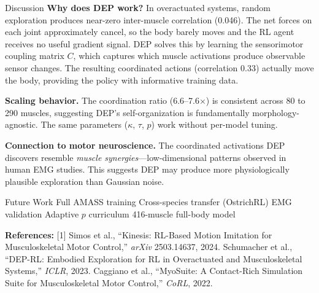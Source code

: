 \documentclass[landscape]{article}
\begin{document}
\hfill
\begin{minipage}[t]{0.26\textwidth}

\begin{posterblock}{Discussion}
\fontsize{13}{16}\selectfont
\textbf{Why does DEP work?} In overactuated systems, random exploration produces near-zero inter-muscle correlation (0.046). The net forces on each joint approximately cancel, so the body barely moves and the RL agent receives no useful gradient signal. DEP solves this by learning the sensorimotor coupling matrix $C$, which captures which muscle activations produce observable sensor changes. The resulting coordinated actions (correlation 0.33) actually move the body, providing the policy with informative training data.

\vspace{4pt}
\textbf{Scaling behavior.} The coordination ratio (6.6--7.6$\times$) is consistent across 80 to 290 muscles, suggesting DEP's self-organization is fundamentally morphology-agnostic. The same parameters ($\kappa$, $\tau$, $p$) work without per-model tuning.

\vspace{4pt}
\textbf{Connection to motor neuroscience.} The coordinated activations DEP discovers resemble \textit{muscle synergies}---low-dimensional patterns observed in human EMG studies. This suggests DEP may produce more physiologically plausible exploration than Gaussian noise.
\end{posterblock}

\begin{posterblock}{Future Work}
\fontsize{13}{16}\selectfont
Full AMASS training \textbar{} Cross-species transfer (OstrichRL) \textbar{} EMG validation \textbar{} Adaptive $p$ curriculum \textbar{} 416-muscle full-body model
\end{posterblock}

\end{minipage}

\vspace{1pt}

\noindent
\begin{tcolorbox}[colback=stanforddark, colframe=stanforddark, coltext=white,
  boxrule=0pt, arc=4pt, top=5pt, bottom=5pt, left=10pt, right=10pt]
\fontsize{12.5}{15}\selectfont
\textbf{References:} [1] Simos et al., ``Kinesis: RL-Based Motion Imitation for Musculoskeletal Motor Control,'' \textit{arXiv} 2503.14637, 2024. \quad
[2] Schumacher et al., ``DEP-RL: Embodied Exploration for RL in Overactuated and Musculoskeletal Systems,'' \textit{ICLR}, 2023. \quad
[3] Caggiano et al., ``MyoSuite: A Contact-Rich Simulation Suite for Musculoskeletal Motor Control,'' \textit{CoRL}, 2022.
\end{tcolorbox}
\end{document}
